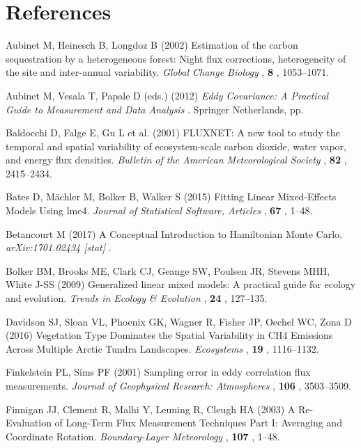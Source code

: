 \section*{References}\label{references}

\hypertarget{refs}{}
\hypertarget{ref-Aubinet2002}{}
Aubinet M, Heinesch B, Longdoz B (2002) Estimation of the carbon
sequestration by a heterogeneous forest: Night flux corrections,
heterogeneity of the site and inter-annual variability. \emph{Global
Change Biology} , \textbf{8} , 1053--1071.

\hypertarget{ref-Aubinet2012}{}
Aubinet M, Vesala T, Papale D (eds.) (2012) \emph{\textup{Eddy
Covariance: A Practical Guide to Measurement and Data Analysis}} .
Springer Netherlands, pp.

\hypertarget{ref-Baldocchi2001}{}
Baldocchi D, Falge E, Gu L et al. (2001) FLUXNET: A new tool to study
the temporal and spatial variability of ecosystem-scale carbon dioxide,
water vapor, and energy flux densities. \emph{Bulletin of the American
Meteorological Society} , \textbf{82} , 2415--2434.

\hypertarget{ref-Bates2015}{}
Bates D, Mächler M, Bolker B, Walker S (2015) Fitting Linear
Mixed-Effects Models Using lme4. \emph{Journal of Statistical Software,
Articles} , \textbf{67} , 1--48.

\hypertarget{ref-Betancourt2017}{}
Betancourt M (2017) A Conceptual Introduction to Hamiltonian Monte
Carlo. \emph{arXiv:1701.02434 {[}stat{]}} .

\hypertarget{ref-Bolker2009}{}
Bolker BM, Brooks ME, Clark CJ, Geange SW, Poulsen JR, Stevens MHH,
White J-SS (2009) Generalized linear mixed models: A practical guide for
ecology and evolution. \emph{Trends in Ecology \& Evolution} ,
\textbf{24} , 127--135.

\hypertarget{ref-Davidson2016}{}
Davidson SJ, Sloan VL, Phoenix GK, Wagner R, Fisher JP, Oechel WC, Zona
D (2016) Vegetation Type Dominates the Spatial Variability in CH4
Emissions Across Multiple Arctic Tundra Landscapes. \emph{Ecosystems} ,
\textbf{19} , 1116--1132.

\hypertarget{ref-Finkelstein2001}{}
Finkelstein PL, Sims PF (2001) Sampling error in eddy correlation flux
measurements. \emph{Journal of Geophysical Research: Atmospheres} ,
\textbf{106} , 3503--3509.

\hypertarget{ref-Finnigan2003}{}
Finnigan JJ, Clement R, Malhi Y, Leuning R, Cleugh HA (2003) A
Re-Evaluation of Long-Term Flux Measurement Techniques Part I: Averaging
and Coordinate Rotation. \emph{Boundary-Layer Meteorology} ,
\textbf{107} , 1--48.

